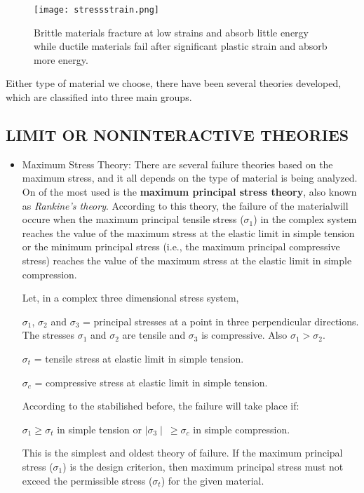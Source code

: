 \documentclass[letterpaper]{article}
\begin{document}
\begin{multicols}{2}
	\begin{figure}[H]
		\centering
		\texttt{[image: stressstrain.png]}
		\caption{Brittle materials fracture at low strains and absorb little energy while ductile materials fail after significant plastic strain and absorb more energy.}
	\end{figure}
	Either type of material we choose, there have been several theories developed, which are classified into three main groups.\supercite{rajanish13}

	\subsection*{LIMIT OR NONINTERACTIVE THEORIES}
	\begin{itemize}
		\item Maximum Stress Theory: There are several failure theories based on the maximum stress, and it all depends on the type of material is being analyzed. On of the most used is the \textbf{maximum principal stress theory}, also known as \textit{Rankine's theory}. According to this theory, the failure of the materialwill occure when the maximum principal tensile stress ($\sigma_1$) in the complex system reaches the value of the maximum stress at the elastic limit in simple tension or the minimum principal stress (i.e., the maximum principal compressive stress) reaches the value of the maximum stress at the elastic limit in simple compression.\supercite{bansal09}

			Let, in a complex three dimensional stress system,

			$\sigma_1$, $\sigma_2$ and $\sigma_3$ = principal stresses at a point in three perpendicular directions. The stresses $\sigma_1$ and $\sigma_2$ are tensile and $\sigma_3$ is compressive. Also $\sigma_1 > \sigma_2$.

			$\sigma_t$ = tensile stress at elastic limit in simple tension.

			$\sigma_c$ = compressive stress at elastic limit in simple tension.

			According to the stabilished before, the failure will take place if:

			$\sigma_1 \geq \sigma_t$ in simple tension or $\mid \sigma_3 \mid \ \geq \sigma_c$ in simple compression.

			This is the simplest and oldest theory of failure. If the maximum principal stress ($\sigma_1$) is the design criterion, then maximum principal stress must not exceed the permissible stress ($\sigma_t$) for the given material.


\end{itemize}
\end{multicols}
\end{document}
